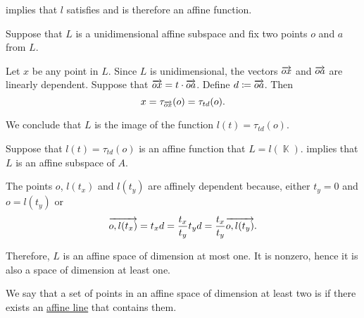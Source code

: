 \begin{defproof}
    implies that \( l \) satisfies  and is therefore an affine function.

   Suppose that \( L \) is a unidimensional affine subspace and fix two points \( o \) and \( a \) from \( L \).

  Let \( x \) be any point in \( L \). Since \( L \) is unidimensional, the vectors \( \overrightarrow{ox} \) and \( \overrightarrow{oa} \) are linearly dependent. Suppose that \( \overrightarrow{ox} = t \cdot \overrightarrow{oa} \). Define \( d \coloneqq \overrightarrow{oa} \). Then
  \begin{equation*}
    x = \tau_{\overrightarrow{ox}}(o) = \tau_{td}(o).
  \end{equation*}

  We conclude that \( L \) is the image of the function \( l(t) = \tau_{td}(o) \).

   Suppose that \( l(t) = \tau_{td}(o) \) is an affine function that \( L = l(\BbbK) \).  implies that \( L \) is an affine subspace of \( A \).

  The points \( o \), \( l(t_x) \) and \( l(t_y) \) are affinely dependent because, either \( t_y = 0 \) and \( o = l(t_y) \) or
  \begin{equation*}
    \overrightarrow{o,l(t_x)} = t_x d = \frac {t_x} {t_y} t_y d = \frac {t_x} {t_y} \overrightarrow{o,l(t_y)}.
  \end{equation*}

  Therefore, \( L \) is an affine space of dimension at most one. It is nonzero, hence it is also a space of dimension at least one.
\end{defproof}

\begin{definition}\label{def:collinear_points}\mimprovised
  We say that a set of points in an affine space of dimension at least two is  if there exists an \hyperref[def:affine_line]{affine line} that contains them.
\end{definition}

